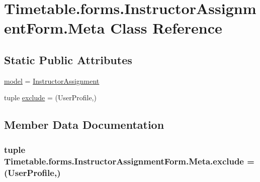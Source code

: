 \hypertarget{classTimetable_1_1forms_1_1InstructorAssignmentForm_1_1Meta}{}\section{Timetable.\+forms.\+Instructor\+Assignment\+Form.\+Meta Class Reference}
\label{classTimetable_1_1forms_1_1InstructorAssignmentForm_1_1Meta}
\subsection*{Static Public Attributes}
\begin{DoxyCompactItemize}
\item 
\hyperlink{classTimetable_1_1forms_1_1InstructorAssignmentForm_1_1Meta_a7914c57f1630e7eb0ba4f6ec804fbfd5}{model} = \hyperlink{classTimetable_1_1models_1_1InstructorAssignment}{Instructor\+Assignment}
\item 
tuple \hyperlink{classTimetable_1_1forms_1_1InstructorAssignmentForm_1_1Meta_a5a5bfb45bba4784ae3854596ba46f169}{exclude} = (\textquotesingle{}User\+Profile\textquotesingle{},)
\end{DoxyCompactItemize}


\subsection{Member Data Documentation}
\subsubsection[{\texorpdfstring{exclude}{exclude}}]{\setlength{\rightskip}{0pt plus 5cm}tuple Timetable.\+forms.\+Instructor\+Assignment\+Form.\+Meta.\+exclude = (\textquotesingle{}User\+Profile\textquotesingle{},)\hspace{0.3cm}{\ttfamily [static]}}\hypertarget{classTimetable_1_1forms_1_1InstructorAssignmentForm_1_1Meta_a5a5bfb45bba4784ae3854596ba46f169}{}\label{classTimetable_1_1forms_1_1InstructorAssignmentForm_1_1Meta_a5a5bfb45bba4784ae3854596ba46f169}
